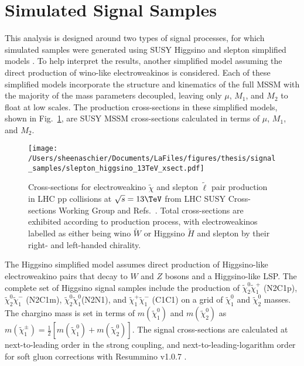 \section{Simulated Signal Samples}
\label{sec:sig}
This analysis is designed around two types of signal processes, for which simulated samples were generated using SUSY Higgsino and slepton simplified models \cite{wacker, toro, alves}.  To help interpret the results, another simplified model assuming the direct production of wino-like electroweakinos is considered.  Each of these simplified models incorporate the structure and kinematics of the full MSSM with the majority of the mass parameters decoupled, leaving only $\mu$, $M_1$, and $M_2$ to float at low scales.  The production cross-sections in these simplified models, shown in Fig.~\ref{fig:xsec}, are SUSY MSSM cross-sections calculated in terms of $\mu$, $M_1$, and $M_2$. 
  \begin{figure}[tbp]
   \texttt{[image: /Users/sheenaschier/Documents/LaFiles/figures/thesis/signal\_samples/slepton\_higgsino\_13TeV\_xsect.pdf]}
   \caption{Cross-sections for electroweakino $\tilde\chi$ and slepton $\tilde\ell$ pair production in LHC pp collisions at $\sqrt{s}=13\TeV$ from LHC SUSY Cross-sections Working Group and Refs.~\cite{fuks, klasen}.  Total cross-sections are exhibited according to production process, with electroweakinos labelled as either being wino $\tilde W$ or Higgsino $\tilde H$ and slepton by their right- and left-handed chirality.}
   \label{fig:xsec}
  \end{figure}

The Higgsino simplified model assumes direct production of Higgsino-like electroweakino pairs that decay to $W$ and $Z$ bosons and a Higgsino-like LSP.  The complete set of Higgsino signal samples include the production of $\tilde\chi_2^0\tilde\chi_1^+$ (N2C1p), $\tilde\chi_2^0\tilde\chi_1^-$ (N2C1m), $\tilde\chi_2^0\tilde\chi_1^0$(N2N1), and $\tilde\chi_1^+\tilde\chi_1^-$ (C1C1) on a grid of $\tilde\chi_1^0$ and $\tilde\chi_2^0$ masses.  The chargino mass is set in terms of $m(\tilde\chi_1^0)$ and $m(\tilde\chi_2^0)$ as $m(\tilde\chi_1^\pm)=\frac{1}{2}[m(\tilde\chi_1^0)+m(\tilde\chi_2^0)]$.  The signal cross-sections are calculated at next-to-leading order in the strong coupling, and next-to-leading-logarithm order for soft gluon corrections with Resummino v1.0.7 \cite{fuks}.

